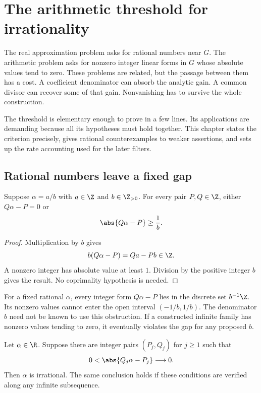 \chapter{The arithmetic threshold for irrationality}
\label{ch:lattice}

The real approximation problem asks for rational numbers near $G$. The arithmetic problem asks for nonzero integer linear forms in $G$ whose absolute values tend to zero. These problems are related, but the passage between them has a cost. A coefficient denominator can absorb the analytic gain. A common divisor can recover some of that gain. Nonvanishing has to survive the whole construction.

The threshold is elementary enough to prove in a few lines. Its applications are demanding because all its hypotheses must hold together. This chapter states the criterion precisely, gives rational counterexamples to weaker assertions, and sets up the rate accounting used for the later filters.

\section{Rational numbers leave a fixed gap}

\begin{lemma}
\label{lem:c02-gap}
Suppose $\alpha=a/b$ with $a\in\Z$ and $b\in\Z_{>0}$. For every pair $P,Q\in\Z$, either $Q\alpha-P=0$ or
\begin{equation}
\abs{Q\alpha-P}\geq\frac1b.
\label{eq:c02-gap}
\end{equation}
\end{lemma}

\begin{proof}
Multiplication by $b$ gives
\[
b(Q\alpha-P)=Qa-Pb\in\Z.
\]
A nonzero integer has absolute value at least $1$. Division by the positive integer $b$ gives the result. No coprimality hypothesis is needed.
\end{proof}

For a fixed rational $\alpha$, every integer form $Q\alpha-P$ lies in the discrete set $b^{-1}\Z$. Its nonzero values cannot enter the open interval $(-1/b,1/b)$. The denominator $b$ need not be known to use this obstruction. If a constructed infinite family has nonzero values tending to zero, it eventually violates the gap for any proposed $b$.

\begin{theorem}
\label{thm:c02-criterion}
Let $\alpha\in\R$. Suppose there are integer pairs $(P_j,Q_j)$ for $j\geq1$ such that
\begin{equation}
0<\abs{Q_j\alpha-P_j}\longrightarrow0.
\label{eq:c02-form-criterion}
\end{equation}
Then $\alpha$ is irrational. The same conclusion holds if these conditions are verified along any infinite subsequence.
\end{theorem}

